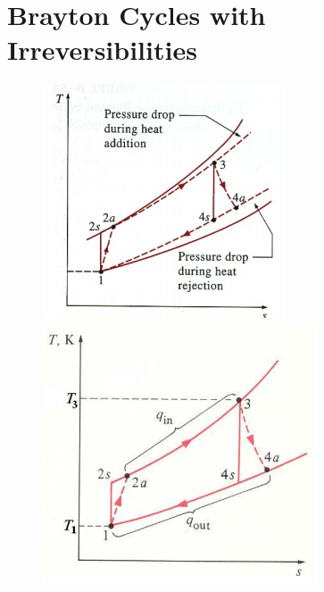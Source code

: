 \documentclass[class=report, crop=false, 12pt,a4paper]{standalone}
\numberwithin{equation}{section}
\begin{document}
\section{Brayton Cycles with Irreversibilities}
\begin{figure}[H]
  \begin{center}
    \begin{minipage}[b]{0.46\textwidth}
      \centering
      \includegraphics[width = 0.85 \textwidth]{../img/diagram162.png}
      \caption{}
    \end{minipage}
    \begin{minipage}[b]{0.46\textwidth}
      \centering
      \includegraphics[width = 0.85 \textwidth]{../img/diagram163.png}
      \caption{}
    \end{minipage}
  \end{center}
\end{figure}
\end{document}
